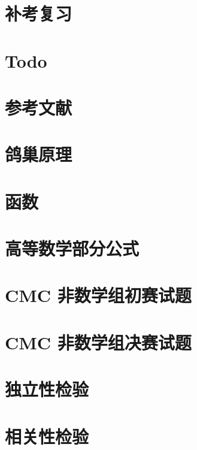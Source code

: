 \documentclass[lang=cn,10pt,color=cyan,titlestyle=hang,device=normal]{elegantbook}
\begin{document}
\chapter{补考复习}


\chapter{Todo}


\chapter{参考文献}


\chapter{鸽巢原理}


\chapter{函数}



\chapter{高等数学部分公式}


\chapter{CMC 非数学组初赛试题}


\chapter{CMC 非数学组决赛试题}


\chapter{独立性检验}




\chapter{相关性检验}


\end{document}
